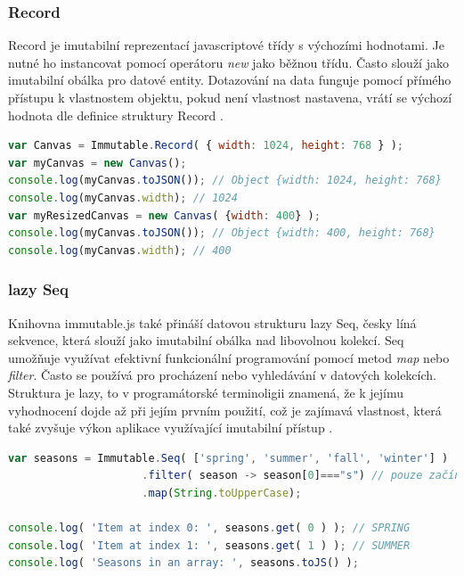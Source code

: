 \subsubsection{Record}
Record je imutabilní reprezentací javascriptové třídy s výchozími hodnotami. Je nutné ho instancovat pomocí operátoru \textit{new} jako běžnou třídu. Často slouží jako imutabilní obálka pro datové entity. Dotazování na data funguje pomocí přímého přístupu k vlastnostem objektu, pokud není vlastnost nastavena, vrátí se výchozí hodnota dle definice struktury Record \cite{immutablejs} \cite{immutablejs_learn}.
\begin{lstlisting}[language=Javascript,caption={Ukázka práce s imutabilním objektem Record v immutable.js \cite{immutablejs}}]
var Canvas = Immutable.Record( { width: 1024, height: 768 } );
var myCanvas = new Canvas();
console.log(myCanvas.toJSON()); // Object {width: 1024, height: 768}
console.log(myCanvas.width); // 1024
var myResizedCanvas = new Canvas( {width: 400} );
console.log(myCanvas.toJSON()); // Object {width: 400, height: 768}
console.log(myCanvas.width); // 400
\end{lstlisting}

\subsubsection{lazy Seq}
Knihovna immutable.js také přináší datovou strukturu lazy Seq, česky líná sekvence, která slouží jako imutabilní obálka nad libovolnou kolekcí. Seq umožňuje využívat efektivní funkcionální programování pomocí metod \textit{map} nebo \textit{filter}. Často se používá pro procházení nebo vyhledávání v datových kolekcích. Struktura je lazy, to v programátorské terminoligii znamená, že k jejímu vyhodnocení dojde až při jejím prvním použití, což je zajímavá vlastnost, která také zvyšuje výkon aplikace využívající imutabilní přístup \cite{immutablejs} \cite{immutablejs_learn}.
\begin{lstlisting}[language=Javascript, caption={Ukázka používání lazy Seq v immutable.js \cite{immutablejs_learn}}] 
var seasons = Immutable.Seq( ['spring', 'summer', 'fall', 'winter'] )
                     .filter( season -> season[0]==="s") // pouze začínající na "s"
                     .map(String.toUpperCase);
 
console.log( 'Item at index 0: ', seasons.get( 0 ) ); // SPRING
console.log( 'Item at index 1: ', seasons.get( 1 ) ); // SUMMER
console.log( 'Seasons in an array: ', seasons.toJS() );
\end{lstlisting}

